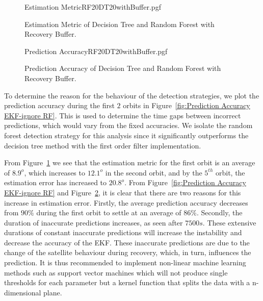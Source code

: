 \documentclass[letterpaper, 10 pt, conference]{ieeeconf}  %
\begin{document}
\begin{figure}[!htb]
	\begin{center}
		{Estimation MetricRF20DT20withBuffer.pgf}
	\end{center}
	\caption[Estimation Metric of Decision Tree and Random Forest with Recovery Buffer]{Estimation Metric of Decision Tree and Random Forest with Recovery Buffer.}
	\label{fig:Estimation Accuracy EKF-ignore DT and RF with Recovery Buffer}
\end{figure}

\begin{figure}[!htb]
	\begin{center}
		{Prediction AccuracyRF20DT20withBuffer.pgf}
	\end{center}
	\caption[Prediction Accuracy of Decision Tree and Random Forest with Recovery Buffer]{Prediction Accuracy of Decision Tree and Random Forest with Recovery Buffer.}
	\label{fig:Summary Prediction Accuracy EKF-ignore DT and RF with Recovery Buffer}
\end{figure}

To determine the reason for the behaviour of the detection strategies, we plot the prediction accuracy during the first $2$ orbits in Figure~\ref{fig:Prediction Accuracy EKF-ignore RF}. This is used to determine the time gaps between incorrect predictions, which would vary from the fixed accuracies. We isolate the random forest detection strategy for this analysis since it significantly outperforms the decision tree method with the first order filter implementation.

From Figure~\ref{fig:Estimation Accuracy EKF-ignore DT and RF with Recovery Buffer} we see that the estimation metric for the first orbit is an average of $8.9^o$, which increases to $12.1^o$ in the second orbit, and by the $5^{th}$ orbit, the estimation error has increased to $20.8^o$. From Figure~\ref{fig:Prediction Accuracy EKF-ignore RF} and Figure~\ref{fig:Summary Prediction Accuracy EKF-ignore DT and RF with Recovery Buffer}, it is clear that there are two reasons for this increase in estimation error. Firstly, the average prediction accuracy decreases from $90\%$ during the first orbit to settle at an average of $86\%$. Secondly, the duration of inaccurate predictions increases, as seen after $7500s$. These extensive durations of constant inaccurate predictions will increase the instability and decrease the accuracy of the EKF. These inaccurate predictions are due to the change of the satellite behaviour during recovery, which, in turn, influences the prediction. It is thus recommended to implement non-linear machine learning methods such as support vector machines which will not produce single thresholds for each parameter but a kernel function that splits the data with a n-dimensional plane.
\end{document}
